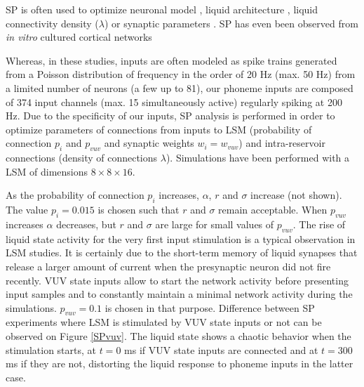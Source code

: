 \documentclass[11pt, a4paper]{article} %
\begin{document}
SP is often used to optimize neuronal model \cite{hourdakis2013use, wojcik2007liquid, grzyb2009model, wojcik2012electrical}, liquid architecture \cite{hourdakis2013use}, liquid connectivity density ($\lambda$) \cite{hourdakis2013use, grzyb2009model, maass2002real} or synaptic parameters \cite{pipaextended}. SP has even been observed from \textit{in vitro} cultured cortical networks \cite{dockendorf2009liquid}

Whereas, in these studies, inputs are often modeled as spike trains generated from a Poisson distribution of frequency in the order of 20 Hz (max. 50 Hz) from a limited number of neurons (a few up to 81), our phoneme inputs are composed of 374 input channels (max. 15 simultaneously active) regularly spiking at 200 Hz. Due to the specificity of our inputs, SP analysis is performed in order to optimize parameters of connections from inputs to LSM (probability of connection $p_i$ and $p_{vuv}$ and synaptic weights $w_i = w_{vuv}$) and intra-reservoir connections (density of connections $\lambda$). Simulations have been performed with a LSM of dimensions $8 \times 8 \times 16$.

As the probability of connection $p_i$ increases, $\alpha$, $r$ and $\sigma$ increase (not shown). The value $p_i = 0.015$ is chosen such that $r$ and $\sigma$ remain acceptable. When $p_{vuv}$ increases $\alpha$ decreases, but $r$ and $\sigma$ are large for small values of $p_{vuv}$. The rise of liquid state activity for the very first input stimulation is a typical observation in LSM studies. It is certainly due to the short-term memory of liquid synapses that release a larger amount of current when the presynaptic neuron did not fire recently. VUV state inputs allow to start the network activity before presenting input samples and to constantly maintain a minimal network activity during the simulations. $p_{vuv} = 0.1$ is chosen in that purpose. Difference between SP experiments where LSM is stimulated by VUV state inputs or not can be observed on Figure \ref{SPvuv}. The liquid state shows a chaotic behavior when the stimulation starts, at $t=0$ ms if VUV state inputs are connected and at $t=300$ ms if they are not, distorting the liquid response to phoneme inputs in the latter case.
\end{document}
